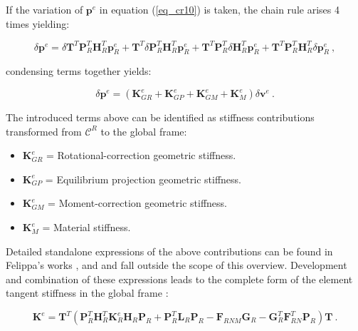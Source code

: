  If the variation of $\mathbf{p}^e$ in equation (\ref{eq_cr10}) is taken, the chain rule arises 4 times yielding:
 
  \begin{equation} 
 \delta \mathbf{p}^e
 =
\delta \mathbf{T}^T \mathbf{P}_R^T \mathbf{H}_R^T \mathbf{p}_R^e
+
\mathbf{T}^T \delta \mathbf{P}_R^T \mathbf{H}_R^T \mathbf{p}_R^e
+
\mathbf{T}^T \mathbf{P}_R^T \delta \mathbf{H}_R^T \mathbf{p}_R^e
+
\mathbf{T}^T\mathbf{P}_R^T \mathbf{H}_R^T  \delta \mathbf{p}_R^e
 \label{eq_cr12}\ ,
 \end{equation}
 
 condensing terms together yields:
 
   \begin{equation} 
 \delta \mathbf{p}^e
 =
(\mathbf{K}_{GR}^e + 
\mathbf{K}_{GP}^e + 
\mathbf{K}_{GM}^e + 
\mathbf{K}_{M}^e
)
\delta \mathbf{v}^e
 \label{eq_cr13}\ .
 \end{equation}
 
 The introduced terms above can be identified as stiffness contributions transformed from $\mathscr{C}^R$ to the global frame:
 
 \begin{itemize}
 	\item $\mathbf{K}_{GR}^e$ = Rotational-correction geometric stiffness.
 	\item $\mathbf{K}_{GP}^e$ = Equilibrium projection geometric stiffness.
 	\item $\mathbf{K}_{GM}^e$ = Moment-correction geometric stiffness.
 	\item $\mathbf{K}_{M}^e$ = Material stiffness.
 \end{itemize}
 
 Detailed standalone expressions of the above contributions can be found in Felippa's works \cite{felippa2005unified}, \cite{felippa2000systematic} and \cite{FelippaCR1_2016} and fall outside the scope of this overview. Development and combination of these expressions leads to the complete form of the element tangent stiffness in the global frame \cite{felippa2005unified}:
 
\begin{equation} 
\mathbf{K}^e 
 =
 \mathbf{T}^T
 (
 \mathbf{P}_R^T
 \mathbf{H}_R^T
 \mathbf{K}_R^e
  \mathbf{H}_R
   \mathbf{P}_R
+
 \mathbf{P}_R^T
  \mathbf{L}_R
\mathbf{P}_R
-
\mathbf{F}_{RNM}
 \mathbf{G}_R
 -
  \mathbf{G}_R^T
  \mathbf{F}_{RN}^T
\mathbf{P}_R
 )
\mathbf{T}
 \label{eq_cr14}\ .
 \end{equation}
 
